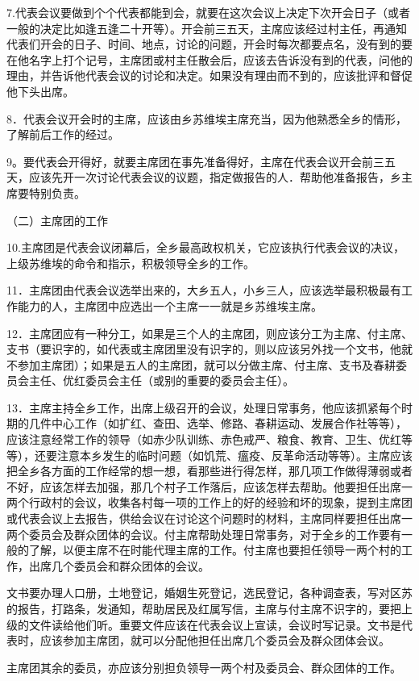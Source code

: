 7.代表会议要做到个个代表都能到会，就要在这次会议上决定下次开会日子（或者一般的决定比如逢五逢二十开等）。开会前三五天，主席应该经过村主任，再通知代表们开会的日子、时间、地点，讨论的问题，开会时每次都要点名，没有到的要在他名字上打个记号，主席团或村主任散会后，应该去告诉没有到的代表，问他的理由，并告诉他代表会议的讨论和决定。如果没有理由而不到的，应该批评和督促他下头出席。

8．代表会议开会时的主席，应该由乡苏维埃主席充当，因为他熟悉全乡的情形，了解前后工作的经过。

9。要代表会开得好，就要主席团在事先准备得好，主席在代表会议开会前三五天，应该先开一次讨论代表会议的议题，指定做报告的人．帮助他准备报告，乡主席要特别负责。

（二）主席团的工作

10.主席团是代表会议闭幕后，全乡最高政权机关，它应该执行代表会议的决议，上级苏维埃的命令和指示，积极领导全乡的工作。

11．主席团由代表会议选举出来的，大乡五人，小乡三人，应该选举最积极最有工作能力的人，主席团中应选出一个主席一一就是乡苏维埃主席。

12．主席团应有一种分工，如果是三个人的主席团，则应该分工为主席、付主席、支书（要识字的，如代表或主席团里没有识字的，则以应该另外找一个文书，他就不参加主席团）；如果是五人的主席团，就可以分做主席、付主席、支书及春耕委员会主任、优红委员会主任（或别的重要的委员会主任）。

13．主席主持全乡工作，出席上级召开的会议，处理日常事务，他应该抓紧每个时期的几件中心工作（如扩红、查田、选举、修路、春耕运动、发展合作社等等），应该注意经常工作的领导（如赤少队训练、赤色戒严、粮食、教育、卫生、优红等等），还要注意本乡发生的临时问题（如饥荒、瘟疫、反革命活动等等）。主席应该把全乡各方面的工作经常的想一想，看那些进行得怎样，那几项工作做得薄弱或者不好，应该怎样去加强，那几个村子工作落后，应该怎样去帮助。他要担任出席一两个行政村的会议，收集各村每一项的工作上的好的经验和坏的现象，提到主席团或代表会议上去报告，供给会议在讨论这个问题时的材料，主席同样要担任出席一两个委员会及群众团体的会议。付主席帮助处理日常事务，对于全乡的工作要有一般的了解，以便主席不在时能代理主席的工作。付主席也要担任领导一两个村的工作，出席几个委员会和群众团体的会议。

文书要办理人口册，土地登记，婚姻生死登记，选民登记，各种调查表，写对区苏的报告，打路条，发通知，帮助居民及红属写信，主席与付主席不识字的，要把上级的文件读给他们听。重要文件应该在代表会议上宣读，会议时写记录。文书是代表时，应该参加主席团，就可以分配他担任出席几个委员会及群众团体会议。

主席团其余的委员，亦应该分别担负领导一两个村及委员会、群众团体的工作。

